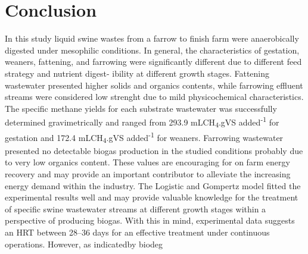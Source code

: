 \section{Conclusion}
In this study liquid swine wastes from a farrow to finish farm were anaerobically digested under mesophilic conditions. In general, the characteristics of gestation, weaners, fattening, and farrowing were significantly different due to different feed strategy and nutrient digest- ibility at different growth stages. Fattening wastewater presented higher solids and organics contents, while farrowing effluent streams were considered low strenght due to mild physicochemical characteristics. The specific methane yields for each substrate wastewater was successfully determined gravimetrically  and ranged from 293.9 mLCH\textsubscript{4}.gVS added\textsuperscript{-1} for gestation and 172.4 mLCH\textsubscript{4}.gVS added\textsuperscript{-1} for weaners. Farrowing wastewater presented no detectable biogas production in the studied conditions probably due to very low organics content. These values are encouraging for on farm energy recovery and may provide an important contributor to alleviate the increasing energy demand within the industry. The Logistic and Gompertz model fitted the experimental results well and may provide valuable knowledge for the treatment of specific swine wastewater streams at different growth stages within a perspective of producing biogas. With this in mind, experimental data suggests an HRT between 28–36 days for an effective treatment under continuous operations. However, as indicatedby biodeg